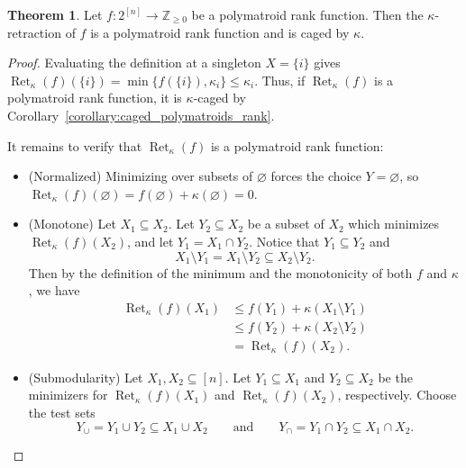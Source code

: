 \documentclass[11pt]{article}
\theoremstyle{definition}
\newtheorem{theorem}{Theorem}[section]
\theoremstyle{remark}
\newcommand{\Zgeq}{\mathbb{Z}_{\geq 0}}       %
\DeclareMathOperator{\Ret}{Ret}                %
\newcommand{\RetK}{\Ret_{\kappa}}              %
\begin{document}
\begin{theorem}\label{thm:rank_retraction_is_polymatroid}
    Let $f\colon 2^{[n]}\rightarrow\Zgeq$ be a polymatroid rank
    function. Then the $\kappa$-retraction of $f$ is a polymatroid rank
    function and is caged by $\kappa$.
\end{theorem}

\begin{proof}
    Evaluating the definition at a singleton $X=\{i\}$ gives
    $\RetK(f)(\{i\})=\min\{f(\{i\}),\kappa_i\}\leq\kappa_i$.
    Thus, if $\RetK(f)$ is a polymatroid rank function, it is
    $\kappa$-caged by Corollary~\ref{corollary:caged_polymatroids_rank}.

    It remains to verify that $\RetK(f)$ is a polymatroid rank function:

    \begin{itemize}
        \item (Normalized) Minimizing over subsets of $\varnothing$ forces
        the choice $Y=\varnothing$, so
        $\RetK(f)(\varnothing)=f(\varnothing)+\kappa(\varnothing)=0$.

        \item (Monotone) Let $X_1\subseteq X_2$. Let
        $Y_2\subseteq X_2$ be a subset of $X_2$ which minimizes
        $\RetK(f)(X_2)$, and let $Y_1=X_1\cap Y_2$. Notice that
        $Y_1\subseteq Y_2$ and
        \[
            X_1\setminus Y_1
            =
            X_1\setminus Y_2
            \subseteq
            X_2\setminus Y_2.
        \]
        Then by the definition of the minimum and the monotonicity of both
        $f$ and $\kappa$, we have
        \begin{align*}
            \RetK(f)(X_1)
            &\leq f(Y_1)+\kappa(X_1\setminus Y_1) \\
            &\leq f(Y_2)+\kappa(X_2\setminus Y_2) \\
            &=\RetK(f)(X_2).
        \end{align*}

        \item (Submodularity) Let $X_1,X_2\subseteq[n]$. Let
        $Y_1\subseteq X_1$ and $Y_2\subseteq X_2$ be the minimizers for
        $\RetK(f)(X_1)$ and $\RetK(f)(X_2)$, respectively. Choose the test
        sets
        \[
            Y_{\cup}=Y_1\cup Y_2\subseteq X_1\cup X_2
            \qquad\text{and}\qquad
            Y_{\cap}=Y_1\cap Y_2\subseteq X_1\cap X_2.
        \]


\end{itemize}
\end{proof}
\end{document}
